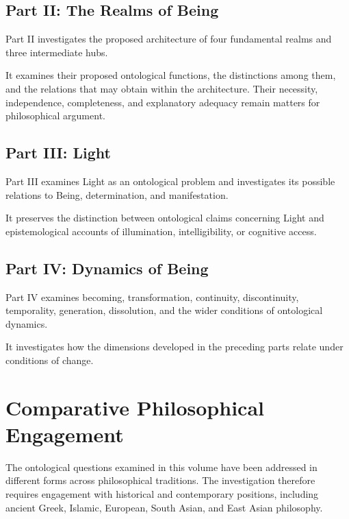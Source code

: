 \subsection*{Part II: The Realms of Being}

Part II investigates the proposed
architecture of four fundamental realms
and three intermediate hubs.

It examines their proposed ontological
functions, the distinctions among them,
and the relations that may obtain within
the architecture. Their necessity,
independence, completeness, and
explanatory adequacy remain matters
for philosophical argument.

\subsection*{Part III: Light}

Part III examines Light as an ontological
problem and investigates its possible
relations to Being, determination,
and manifestation.

It preserves the distinction between
ontological claims concerning Light
and epistemological accounts of
illumination, intelligibility, or
cognitive access.

\subsection*{Part IV: Dynamics of Being}

Part IV examines becoming, transformation,
continuity, discontinuity, temporality,
generation, dissolution, and the wider
conditions of ontological dynamics.

It investigates how the dimensions
developed in the preceding parts
relate under conditions of change.



\section*{Comparative Philosophical Engagement}

The ontological questions examined in
this volume have been addressed in
different forms across philosophical
traditions. The investigation therefore
requires engagement with historical
and contemporary positions, including
ancient Greek, Islamic, European,
South Asian, and East Asian philosophy.

